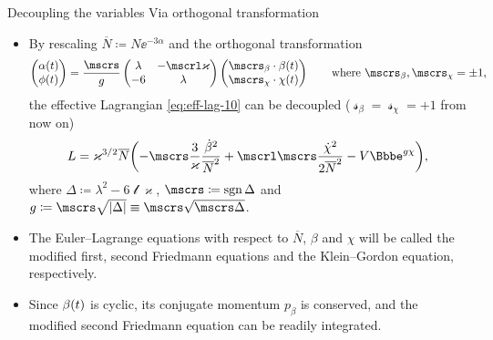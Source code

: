 \documentclass[8pt]{beamer}
\begin{document}
\begin{frame}%
{Decoupling the variables}%
{Via orthogonal transformation}
\begin{itemize}
\item By rescaling $\overline{N} \coloneqq N\ee^{-3\alpha}$ and
%
the orthogonal transformation
\begin{align}
\begin{pmatrix}
\rfun{\alpha}{t} \\ \rfun{\phi}{t}
\end{pmatrix} = \frac{\mscrs}{g}
\begin{pmatrix}
\lambda & -\mscrl\varkappa \\
-6 & \lambda
\end{pmatrix}
\begin{pmatrix}
\mscrs_\beta \cdot \rfun{\beta}{t} \\ \mscrs_\chi \cdot \rfun{\chi}{t}
\end{pmatrix}\qquad\text{where } \mscrs_\beta, \mscrs_\chi = \pm 1,
\end{align}
the effective Lagrangian \cref{eq:eff-lag-10} can be decoupled
($\mscrs_\beta = \mscrs_\chi = +1$ from now on)
\begin{align}
L = \varkappa^{3/2}\overline{N}
\rbr{-\mscrs\frac{3}{\varkappa}\frac{\dot{\beta}^2}{\overline{N}^2}
+\mscrl\mscrs\frac{\dot{\chi}^2}{2\overline{N}^2}
-V\ee^{g \chi}},
\label{eq:lagrangian-decoupled}
\end{align}
where $\Delta \coloneqq \lambda^2 - 6\mscrl\varkappa$,
$\mscrs \coloneqq \sgn \Delta$ and
$g \coloneqq \mscrs \sqrt{\vbr{\Delta}} \equiv \mscrs\sqrt{\mscrs\Delta}$.

\item
The Euler--Lagrange equations with respect to $\overline{N}$, $\beta$ and
$\chi$ will be called the modified first, second Friedmann equations and the
Klein--Gordon equation, respectively.

\item Since ${\beta}\mathopen{}\left(t\right)\mathclose{}$ is cyclic, its conjugate momentum $p_\beta$ is
conserved,
and the modified second Friedmann equation
can be readily integrated.

\end{itemize}
\end{frame}
\end{document}
